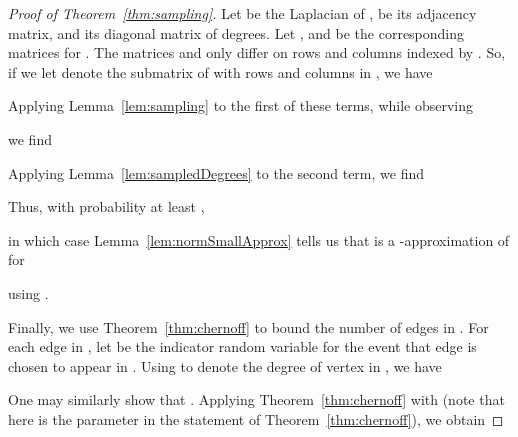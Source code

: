 \documentclass[11pt]{article}
\begin{document}
\begin{proof}[Proof of Theorem~\ref{thm:sampling}]
Let  be the Laplacian of ,  be its adjacency matrix, and 
  its diagonal matrix of degrees.
Let ,  and  be the corresponding matrices for .
The matrices  and  only differ on rows and columns indexed by .
So, if we let  denote the submatrix of  with rows and
  columns in , we have

Applying Lemma~\ref{lem:sampling} to the first of these terms,
  while observing

  we find

Applying Lemma~\ref{lem:sampledDegrees} to the second term,
  we find

Thus, with probability at least ,

in which case Lemma~\ref{lem:normSmallApprox} tells us that
   is a -approximation of 
  for

using
  .

Finally, we use Theorem~\ref{thm:chernoff} to bound the number of edges in .
For each edge  in , let  be the indicator random variable for
  the event that edge  is chosen to appear in .
Using  to denote the degree of vertex  in , we have

One may similarly show that .
Applying Theorem~\ref{thm:chernoff} with  (note that here  is the
parameter in the statement of Theorem~\ref{thm:chernoff}), we obtain



\end{proof}
\end{document}
